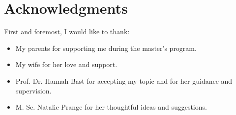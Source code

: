 \chapter*{Acknowledgments}
First and foremost, I would like to thank:
\begin{itemize}
  \item My parents for supporting me during the master's program.
    \item My wife for her love and support.
  \item Prof. Dr. Hannah Bast for accepting my topic and for her guidance and supervision.
    \item M. Sc. Natalie Prange​ for her thoughtful ideas and suggestions.
\end{itemize}
